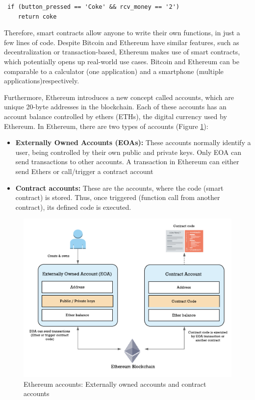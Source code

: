\begin{lstlisting}
 if (button_pressed == 'Coke' && rcv_money == '2')
 	return coke
\end{lstlisting}

Therefore, smart contracts allow anyone to write their own functions, in just a few lines of code. Despite Bitcoin and Ethereum have similar features, such as decentralization or transaction-based, Ethereum makes use of smart contracts, which potentially opens up real-world use cases. Bitcoin and Ethereum can be comparable to a calculator (one application) and a smartphone (multiple applications)respectively.


Furthermore, Ethereum introduces a new concept called accounts, which are unique 20-byte addresses in the blockchain. Each of these accounts has an account balance controlled by ethers (ETHs), the digital currency used by Ethereum. In Ethereum, there are two types of accounts (Figure \ref{fig:EthereumAccounts}):

\begin{itemize}
	
	\item \textbf{Externally Owned Accounts (EOAs):} These accounts normally identify a user, being controlled by their own public and private keys. Only EOA can send transactions to other accounts. A transaction in Ethereum can either send Ethers or call/trigger a contract account  
	\item \textbf{Contract accounts:} These are the accounts, where the code (smart contract) is stored. Thus, once triggered (function call from another contract), its defined code is executed.
\end{itemize}

\begin{figure}[bth]
  \centering
  \includegraphics[scale=0.8]{gfx/ethereumAccounts}    
  \caption{Ethereum accounts: Externally owned accounts and contract 			accounts}
  \label{fig:EthereumAccounts}
\end{figure}

